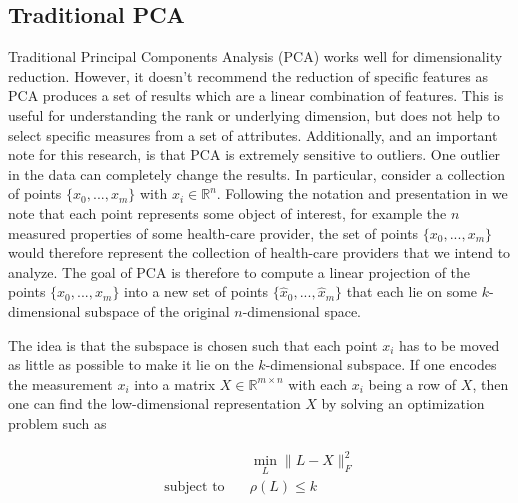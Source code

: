 \documentclass[conference]{IEEEtran}
\begin{document}
\subsection{Traditional PCA} \label{PCA}
Traditional Principal Components Analysis (PCA) works well for dimensionality reduction.  However, it doesn't recommend the reduction of specific features as   PCA produces a set of results which are a linear combination of features.  This is useful for understanding the rank or underlying dimension, but does not help to select specific measures from a set of attributes. Additionally, and an important note for this research, is that PCA is extremely sensitive to outliers.  One outlier in the data can completely change the results.
In particular, consider a collection of
points $\{x_0,...,x_m\}$ with $x_i \in \mathbb{R}^n$.  Following the notation and presentation in \cite{paffenroth2018robust} we note that each point represents some object of interest, for example the $n$ measured properties of some health-care provider, the set of points $\{x_0,...,x_m\}$ would therefore
represent the collection of health-care providers that we intend to analyze.
The goal of PCA is therefore to compute a linear projection of the points $\{x_0,...,x_m\}$ into a new
set of points $\{\hat{x}_0,...,\hat{x}_m\}$ that each lie on some $k$-dimensional subspace of the original
$n$-dimensional space.  

The idea is that the subspace is chosen such that each point $x_i$ has to be moved as little as possible
to make it lie on the $k$-dimensional subspace.  If one encodes the measurement $x_i$ into a matrix
$X \in \mathbb{R}^{m \times n}$ with each $x_i$ being a row of $X$, then one can find
the low-dimensional representation $X$ by solving an optimization problem such as 

\begin{align} \label{PCAopt}
  &\min_{L} \| L-X \|_F^2 \\ \nonumber
  \text{subject to}\quad & \rho(L) \le k
\end{align}
\end{document}
